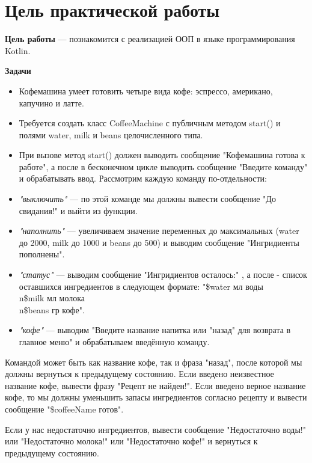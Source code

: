 \graphicspath{{./1/img/}} %

\section*{\LARGE Цель практической работы}

\textbf{Цель работы} --- познакомится с реализацией ООП в языке
программирования Kotlin.

\textbf{Задачи}
\begin{itemize}
	\item Кофемашина умеет готовить четыре вида кофе: эспрессо, американо,
		капучино и латте.
	\item Требуется создать класс CoffeeMachine с публичным методом start() и
		полями water, milk и beans целочисленного типа.
	\item При вызове метод start() должен выводить сообщение "Кофемашина
		готова к работе", а после в бесконечном цикле выводить сообщение
		"Введите команду" и обрабатывать ввод.
		Рассмотрим каждую команду по-отдельности:
	\item \textit{"выключить"} --- по этой команде мы должны вывести сообщение
		"До свидания!" и выйти из функции.
	\item \textit{"наполнить"} --- увеличиваем значение переменных
		до максимальных (water до 2000, milk до 1000 и beans до 500)
		и выводим сообщение "Ингридиенты пополнены".
	\item \textit{"статус"} --- выводим сообщение "Ингридиентов осталось:"
		, а после - список оставшихся ингредиентов в следующем формате:
		"\$water мл воды\\n\$milk мл молока\\n\$beans гр кофе".
	\item \textit{"кофе"} --- выводим "Введите название напитка или "назад" для
		возврата в главное меню" и обрабатываем введённую команду.
\end{itemize}

Командой может быть как название кофе, так и фраза "назад", после
которой мы должны вернуться к предыдущему состоянию. Если введено
неизвестное название кофе, вывести фразу "Рецепт не найден!". Если введено
верное название кофе, то мы должны уменьшить запасы ингредиентов
согласно рецепту и вывести сообщение "\$coffeeName готов".

Если у нас недостаточно ингредиентов, вывести сообщение
"Недостаточно воды!" или "Недостаточно молока!" или "Недостаточно
кофе!" и вернуться к предыдущему состоянию.

